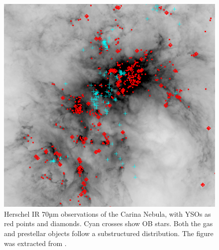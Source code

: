 \begin{figure}
\center
\includegraphics[width=0.7\linewidth]{Figures/0_carina}
\caption[Herschel IR 70µm observations of the Carina Nebula]{Herschel IR 70µm observations of the Carina Nebula, with YSOs as red points and diamonds. Cyan crosses show OB stars. Both the gas and prestellar objects follow a substructured distribution. The figure was extracted from \cite{Gaczkowski2013}.}
\label{Fig:0_carina}
\end{figure}



%
%


